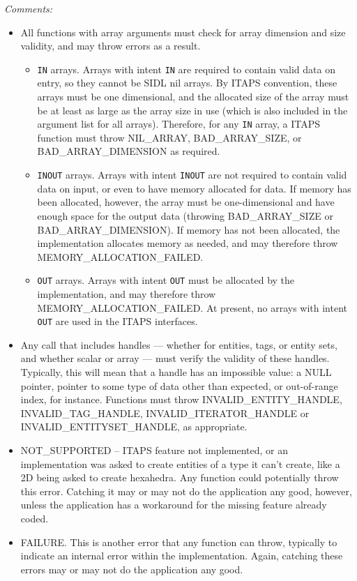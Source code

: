 \documentclass{article}
\begin{document}
\textit{Comments:}
\begin{itemize}
\item All functions with array arguments must check for array dimension 
and size validity, and may throw errors as a result.
  \begin{itemize}

  \item {\tt IN} arrays. Arrays with intent {\tt IN} are required to contain valid 
  data on entry, so they cannot be SIDL nil arrays. By ITAPS convention, 
  these arrays must be one dimensional, and the allocated size 
  of the array must be at least as large as the array size in use 
  (which is also included in the argument list for all arrays). 
  Therefore, for any {\tt IN} array, a ITAPS function must throw NIL\_ARRAY, 
  BAD\_ARRAY\_SIZE, or BAD\_ARRAY\_DIMENSION as required.
  \item {\tt INOUT} arrays. Arrays with intent {\tt INOUT} are not required to contain 
  valid data on input, or even to have memory allocated for data. 
  If memory has been allocated, however, the array must be one-dimensional 
  and have enough space for the output data (throwing BAD\_ARRAY\_SIZE 
  or BAD\_ARRAY\_DIMENSION). If memory has not been allocated, the 
  implementation allocates memory as needed, and may therefore 
  throw MEMORY\_ALLOCATION\_FAILED.
  \item {\tt OUT} arrays. Arrays with intent {\tt OUT} must be allocated by the implementation, 
  and may therefore throw MEMORY\_ALLOCATION\_FAILED. At present, 
  no arrays with intent {\tt OUT} are used in the ITAPS interfaces.
  \end{itemize}

\item Any call that includes handles --- whether for entities, tags, 
or entity sets, and whether scalar or array --- must verify the 
validity of these handles. Typically, this will mean that a handle 
has an impossible value: a NULL pointer, pointer to some type 
of data other than expected, or out-of-range index, for instance. 
Functions must throw INVALID\_ENTITY\_HANDLE, INVALID\_TAG\_HANDLE, 
INVALID\_ITERATOR\_HANDLE or INVALID\_ENTITYSET\_HANDLE, as appropriate.

\item NOT\_SUPPORTED -- ITAPS feature not implemented, or an implementation 
was asked to create entities of a type it can't create, like 
a 2D being asked to create hexahedra. Any function could 
potentially throw this error. Catching it may or may not do the 
application any good, however, unless the application has a workaround 
for the missing feature already coded.

\item FAILURE. This is another error that any function can throw, typically 
to indicate an internal error within the implementation. Again, 
catching these errors may or may not do the application any good.
\end{itemize}
\end{document}
